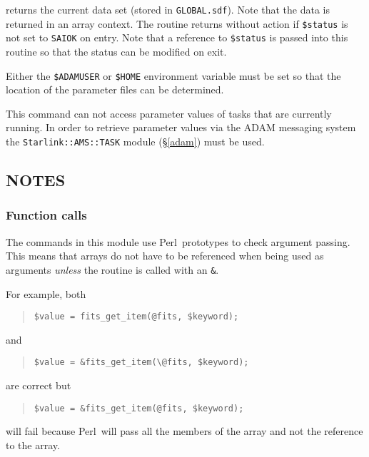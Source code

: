 \documentclass[twoside,11pt]{article}
\newenvironment{myquote}{\begin{quote}\begin{small}}{\end{small}\end{quote}}
\newcommand{\perl}{\xref{\textsf{Perl}}{sun193}{}}
\newcommand{\xref}[3]{#1}
\newcommand{\xlabel}[1]{}
\renewcommand{\_}{\texttt{\symbol{95}}}
\begin{document}
returns the current data set (stored in \texttt{GLOBAL.sdf}). Note that
the data is returned in an array context. The routine returns without
action if \texttt{\$status} is not set to \texttt{SAI\_\_OK} on entry.
Note that a reference to \texttt{\$status} is passed into this routine
so that the status can be modified on exit.

Either the \texttt{\$ADAM\_USER} or \texttt{\$HOME} environment
variable must be set so that the location of the parameter files can be
determined.

This command can not access parameter values of tasks that are currently
running.  In order to retrieve parameter values via the ADAM messaging system
the \texttt{Starlink::AMS::TASK} module (\S\ref{adam}) must be
used.

\subsection{\xlabel{notes}\label{notes}NOTES}

\subsubsection{Function calls}%

The commands in this module use  \perl\ prototypes to check argument
passing. This means that arrays do not have to be referenced when being
used as arguments \emph{unless\/} the routine is called with an \texttt{\&}.

For example, both

\begin{myquote}
\begin{verbatim}
$value = fits_get_item(@fits, $keyword);
\end{verbatim}
\end{myquote}
and
\begin{myquote}
\begin{verbatim}
$value = &fits_get_item(\@fits, $keyword);
\end{verbatim}
\end{myquote}

are correct but
\begin{myquote}
\begin{verbatim}
$value = &fits_get_item(@fits, $keyword);
\end{verbatim}
\end{myquote}

will fail because \perl\ will pass all the members of the array and not the
reference to the array.
\end{document}
